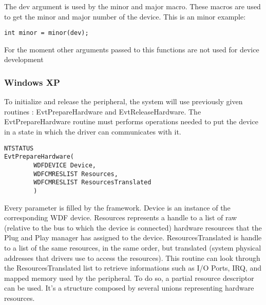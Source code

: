 \documentclass[11pt]{report}
\begin{document}
The dev argument is used by the minor and major macro. These macros are used
to get the minor and major number of the device. This is an minor example:
\begin{lstlisting}
int minor = minor(dev);
\end{lstlisting}
For the moment other arguments passed to this functions are not used for
device development

\subsubsection{Windows XP}
To initialize and release the peripheral, the system will use previously
given routines : EvtPrepareHardware and EvtReleaseHardware.
The EvtPrepareHardware routine must performs operations needed to put the
device in a state in which the driver can communicates with it.
\begin{lstlisting}
NTSTATUS
EvtPrepareHardware(
		WDFDEVICE Device,
		WDFCMRESLIST Resources,
		WDFCMRESLIST ResourcesTranslated
		)
\end{lstlisting}
Every parameter is filled by the framework. Device is an instance
of the corresponding WDF device.
Resources represents a handle to a list of raw (relative to the bus
to which the device is connected) hardware resources that the
Plug and Play manager has assigned to the device.
ResourcesTranslated is handle to a list of the same resources,
in the same order, but translated (system physical addresses that
drivers use to access the resources).
This routine can look through the ResourcesTranslated list to retrieve
informations such as I/O Ports, IRQ, and mapped memory used by the
peripheral.
To do so, a partial resource descriptor can be used. It's a structure
composed by several unions representing hardware resources.
\end{document}
